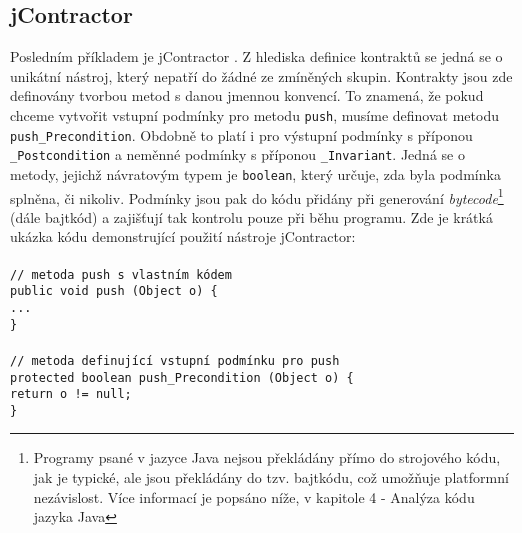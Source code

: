 		\subsection{jContractor}
			Posledním příkladem je jContractor \cite{jcontractor}. Z hlediska definice kontraktů se jedná se o unikátní nástroj, který nepatří do žádné ze zmíněných skupin. Kontrakty jsou zde definovány tvorbou metod s danou jmennou konvencí. To znamená, že pokud chceme vytvořit vstupní podmínky pro metodu \texttt{push}, musíme definovat metodu \texttt{push\_Precondition}. Obdobně to platí i pro výstupní podmínky s příponou \texttt{\_Postcondition} a neměnné podmínky s příponou \texttt{\_Invariant}. Jedná se o metody, jejichž návratovým typem je \texttt{boolean}, který určuje, zda byla podmínka splněna, či nikoliv. Podmínky jsou pak do kódu přidány při generování \emph{bytecode}\footnote{Programy psané v jazyce Java nejsou překládány přímo do strojového kódu, jak je typické, ale jsou překládány do tzv. bajtkódu, což umožňuje platformní nezávislost. Více informací je popsáno níže, v kapitole 4 - Analýza kódu jazyka Java} (dále bajtkód) a zajišťují tak kontrolu pouze při běhu programu. Zde je krátká ukázka kódu demonstrující použití nástroje jContractor:\\\\  
				\- \- \- \- \- \texttt{\textcolor{pgrey}{// metoda push s vlastním kódem}}\\
				\- \- \- \- \- \texttt{public void push (Object o) \{}\\
				\- \- \- \- \- \- \- \- \- \- \texttt{...}\\
				\- \- \- \- \- \texttt{\}}\\\\
				\- \- \- \- \- \texttt{\textcolor{pgrey}{// metoda definující vstupní podmínku pro push}}\\
				\- \- \- \- \- \texttt{protected boolean push\_Precondition (Object o) \{}\\
				\- \- \- \- \- \- \- \- \- \- \texttt{return o != null;}\\
				\- \- \- \- \- \texttt{\}}\\
				

